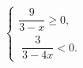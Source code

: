 \begin{ex}[type=ineq_system]
	\begin{condition}
		$\begin{cases} \dfrac{9}{3 - x}\geqslant0  ,\\
			\;  \dfrac{3}{3 - 4x}<0 .
		\end{cases}$
	\end{condition}
\end{ex}